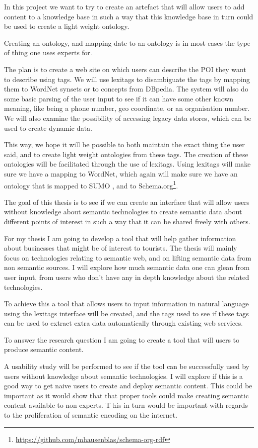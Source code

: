 In this project we want to try to create an artefact that will allow users to add content to a knowledge base in such a way that this knowledge base in turn could be used to create a light weight ontology.

Creating an ontology, and mapping date to an ontology is in most cases the type of thing one uses experts for.

The plan is to create a web site on which users can describe the POI they want to describe using tags.
We will use lexitags to disambiguate the tags by mapping them to WordNet synsets or to concepts from DBpedia. 
The system will also do some basic parsing of the user input to see if it can have some other known meaning, like being a phone number, geo coordinate, or an organisation number.
We will also examine the possibility of accessing legacy data stores, which can be used to create dynamic data.

This way, we hope it will be possible to both maintain the exact thing the user said, and to create light weight ontologies from these tags. 
The creation of these ontologies will be facilitated through the use of lexitags\citep{Veres2011}. 
Using lexitags will make sure we have a mapping to WordNet, which again will make sure we have an ontology that is mapped to SUMO \citep{Niles2003}, and to Schema.org\footnote{\url{https://github.com/mhausenblas/schema-org-rdf}}.

The goal of this thesis is to see if we can create an interface that will allow users without knowledge about semantic technologies to create semantic data about different points of interest in such a way that it can be shared freely with others.


For my thesis I am going to develop a tool that will help gather information about businesses that might be of interest to tourists.
The thesis will mainly focus on technologies relating to semantic web, and on lifting semantic data from non semantic sources.
I will explore how much semantic data one can glean from user input, from users who don't have any in depth knowledge about the related technologies.

To achieve this a tool that allows users to input information in natural language using the lexitags interface will be created, and the tags used to see if these tags can be used to extract extra data automatically through existing web services.

To answer the research question I am going to create a tool that will users to produce semantic content. 

A  usability study will be performed to see if the tool can be successfully used by users without knowledge about semantic technologies. 
I will explore if this is a good way to get naive users to create and deploy semantic content.
This could be important as it would show that that proper tools could make creating semantic content available to non experts. T
his in turn would be important with regards to the proliferation of semantic encoding on the internet.
